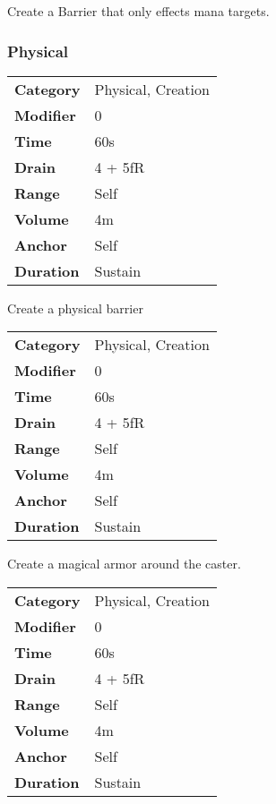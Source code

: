 \hfil

Create a Barrier that only effects mana targets.


\subsubsection{Physical}


\begin{tabular}{ll}
    \textbf{Category} & Physical, Creation \\
    \textbf{Modifier} & 0                  \\
    \textbf{Time}     & 60s                \\
    \textbf{Drain}    & 4 + 5fR            \\
    \textbf{Range}    & Self               \\
    \textbf{Volume}   & 4m                 \\
    \textbf{Anchor}   & Self               \\
    \textbf{Duration} & Sustain            \\
\end{tabular}

\hfil

Create a physical barrier


\begin{tabular}{ll}
    \textbf{Category} & Physical, Creation \\
    \textbf{Modifier} & 0                  \\
    \textbf{Time}     & 60s                \\
    \textbf{Drain}    & 4 + 5fR            \\
    \textbf{Range}    & Self               \\
    \textbf{Volume}   & 4m                 \\
    \textbf{Anchor}   & Self               \\
    \textbf{Duration} & Sustain            \\
\end{tabular}

\hfil

Create a magical armor around the caster.



\begin{tabular}{ll}
    \textbf{Category} & Physical, Creation \\
    \textbf{Modifier} & 0                  \\
    \textbf{Time}     & 60s                \\
    \textbf{Drain}    & 4 + 5fR            \\
    \textbf{Range}    & Self               \\
    \textbf{Volume}   & 4m                 \\
    \textbf{Anchor}   & Self               \\
    \textbf{Duration} & Sustain            \\
\end{tabular}

